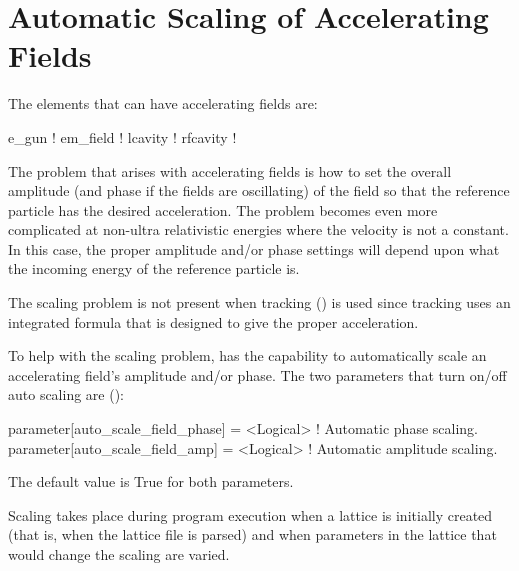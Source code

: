 \chapter{Automatic Scaling of Accelerating Fields}
\label{c:autoscale}

The elements that can have accelerating fields are:
\begin{example}
  e_gun       ! 
  em_field    ! 
  lcavity     ! 
  rfcavity    ! 
\end{example}

The problem that arises with accelerating fields is how to set the
overall amplitude (and phase if the fields are oscillating) of the
field so that the reference particle has the desired acceleration. The
problem becomes even more complicated at non-ultra relativistic
energies where the velocity is not a constant. In this case, the
proper amplitude and/or phase settings will depend upon what the
incoming energy of the reference particle is.

The scaling problem is not present when  tracking
() is used since  tracking uses an
integrated formula that is designed to give the proper acceleration.

To help with the scaling problem, \bmad has the capability to automatically
scale an accelerating field's amplitude and/or phase. The two
parameters that turn on/off auto scaling are ():
\begin{example}
  parameter[auto_scale_field_phase]    = <Logical>  ! Automatic phase scaling.
  parameter[auto_scale_field_amp]      = <Logical>  ! Automatic amplitude scaling.
\end{example}
The default value is True for both parameters. 

Scaling takes place during program execution when a lattice is
initially created (that is, when the lattice file is parsed) and when
parameters in the lattice that would change the scaling are varied.

